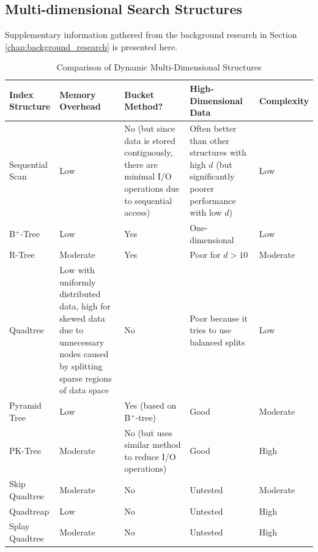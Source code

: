 \begin{landscape}
	\section{Multi-dimensional Search Structures}

	Supplementary information gathered from the background research in Section \ref{chap:background_research} is presented here.

	\begin{table}[h]
		\centering
		\begin{tabular}{|p{2.8cm}|p{5cm}|p{5cm}|p{5cm}|p{2cm}|}
			\hline
			\textbf{Index Structure} &
			\textbf{Memory Overhead} &
			\textbf{Bucket Method?} &
			\textbf{High-Dimensional Data} &
			\textbf{Complexity} \\
			\hline
			Sequential Scan & Low & No (but since data is stored contiguously, there are minimal I/O operations due to sequential access) & Often better than other structures with high $d$ (but significantly poorer performance with low $d$) & Low \\		
			B${}^{+}$-Tree & Low & Yes & One-dimensional & Low \\
			R-Tree & Moderate & Yes & Poor for $d > 10$ \cite{pyramid-tree} & Moderate \\
			Quadtree & Low with uniformly distributed data, high for skewed data due to unnecessary nodes caused by splitting sparse regions of data space & No & Poor because it tries to use balanced splits \cite{pyramid-tree} & Low \\
			Pyramid Tree & Low & Yes (based on B${}^{+}$-tree) & Good & Moderate \\
			PK-Tree & Moderate & No (but uses similar method to reduce I/O operations) & Good & High \\
			Skip Quadtree & Moderate & No & Untested & Moderate \\
			Quadtreap & Low & No & Untested & High \\
			Splay Quadtree & Moderate & No & Untested & High \\
			\hline
		\end{tabular}
		\caption{Comparison of Dynamic Multi-Dimensional Structures}
		\label{tab:comparison}
	\end{table}


\end{landscape}
